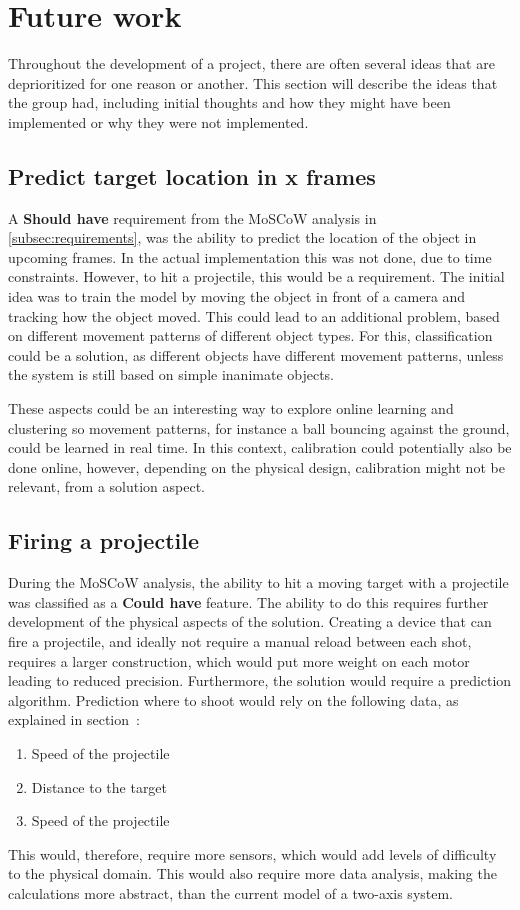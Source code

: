 \section{Future work}\label{sec:futurework}
Throughout the development of a project, there are often several ideas that are deprioritized for one reason or another.
This section will describe the ideas that the group had, including initial thoughts and how they might have been implemented or why they were not implemented.


\subsection{Predict target location in x frames}
A \textbf{Should have} requirement from the MoSCoW analysis in \autoref{subsec:requirements}, was the ability to predict the location of the object in upcoming frames.
In the actual implementation this was not done, due to time constraints.
However, to hit a projectile, this would be a requirement.
The initial idea was to train the model by moving the object in front of a camera and tracking how the object moved.
This could lead to an additional problem, based on different movement patterns of different object types.
For this, classification could be a solution, as different objects have different movement patterns, unless the system is still based on simple inanimate objects.

These aspects could be an interesting way to explore online learning and clustering so movement patterns, for instance a ball bouncing against the ground, could be learned in real time. 
In this context, calibration could potentially also be done online, however, depending on the physical design, calibration might not be relevant, from a solution aspect.



\subsection{Firing a projectile}
During the MoSCoW analysis, the ability to hit a moving target with a projectile was classified as a \textbf{Could have} feature.
The ability to do this requires further development of the physical aspects of the solution.
Creating a device that can fire a projectile, and ideally not require a manual reload between each shot, requires a larger construction, which would put more weight on each motor leading to reduced precision.
Furthermore, the solution would require a prediction algorithm.
Prediction where to shoot would rely on the following data, as explained in section~:
\begin{enumerate}
	\item Speed of the projectile
	\item Distance to the target
	\item Speed of the projectile
\end{enumerate}
This would, therefore, require more sensors, which would add levels of difficulty to the physical domain.
This would also require more data analysis, making the calculations more abstract, than the current model of a two-axis system.


